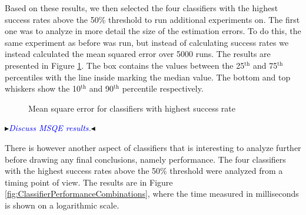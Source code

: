 \documentclass{sig-alternate}
\newcommand{\superscript}[1]{\ensuremath{^{\textrm{#1}}}}
\newcommand{\nbb}[2]{
\fcolorbox{black}{yellow}{\bfseries\sffamily\scriptsize#1}
{\sf$\blacktriangleright$\textcolor{blue}{\textit{#2}}$\blacktriangleleft$}
}
\newcommand{\nbb}[2]{}
\newcommand{\eb}[1]{\nbb{eb}{#1}}
\begin{document}
Based on these results, we then selected the four classifiers with the highest success rates above the 50\% threshold to run additional experiments on. The first one was to analyze in more detail the size of the estimation errors. To do this, the same experiment as before was run, but instead of calculating success rates we instead calculated the mean squared error over 5000 runs. The results are presented in Figure \ref{fig:ClassifierMSQE}. The box contains the values between the 25\superscript{th} and 75\superscript{th} percentiles with the line inside marking the median value. The bottom and top whiskers show the 10\superscript{th} and 90\superscript{th} percentile respectively.

\begin{figure}[htpb]
\begin{center}

	\caption{Mean square error for classifiers with highest success rate}
	\label{fig:ClassifierMSQE}
\end{center}
\end{figure}

\eb{Discuss MSQE results.}

There is however another aspect of classifiers that is interesting to analyze further before drawing any final conclusions, namely performance. The four classifiers with the highest success rates above the 50\% threshold were analyzed from a timing point of view. The results are in Figure \ref{fig:ClassifierPerformanceCombinations}, where the time measured in milliseconds is shown on a logarithmic scale.
\end{document}
